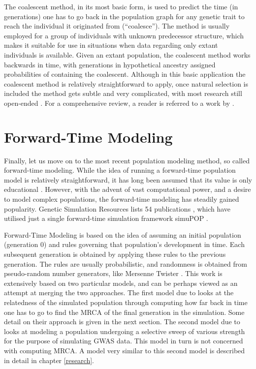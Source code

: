 \documentclass{l4proj}
\begin{document}
The coalescent method, in its most basic form, is used to predict the time (in generations) one has to go back in the population graph for any genetic trait to reach the individual it originated from (``coalesce''). The method is usually employed for a group of individuals with unknown predecessor structure, which makes it suitable for use in situations when data regarding only extant individuals is available. Given an extant population, the coalescent method works backwards in time, with generations in hypothetical ancestry assigned probabilities of containing the coalescent. Although in this basic application the coalescent method is relatively straightforward to apply, once natural selection is included the method gets subtle and very complicated, with most research still open-ended \parencite{Wakeley16}. For a comprehensive review, a reader is referred to a work by \cite{Wakeley16}. 

\section{Forward-Time Modeling}

Finally, let us move on to the most recent population modeling method, so called forward-time modeling. While the idea of running a forward-time population model is relatively straightforward, it has long been assumed that its value is only educational \parencite{peng05}. However, with the advent of vast computational power, and a desire to model complex populations, the forward-time modeling has steadily gained popularity. Genetic Simulation Resources lists 54 publications \parencite{GSR16}, which have utilised just a single forward-time simulation framework simuPOP \parencite{peng05}.

Forward-Time Modeling is based on the idea of assuming an initial population (generation 0) and rules governing that population's development in time. Each subsequent generation is obtained by applying these rules to the previous generation. The rules are usually probabilistic, and randomness is obtained from pseudo-random number generators, like Mersenne Twister \parencite{Matsumoto98}. This work is extensively based on two particular models, and can be perhaps viewed as an attempt at merging the two approaches. The first model due to \cite{rohde04} looks at the relatedness of the simulated population through computing how far back in time one has to go to find the \gls{MRCA} of the final generation in the simulation. Some detail on their approach is given in the next section. The second model due to \cite{peng10} looks at modeling a population undergoing a \gls{selective sweep} of various strength for the purpose of simulating GWAS data. This model in turn is not concerned with computing MRCA. A model very similar to this second model is described in detail in chapter \ref{research}.
\end{document}
